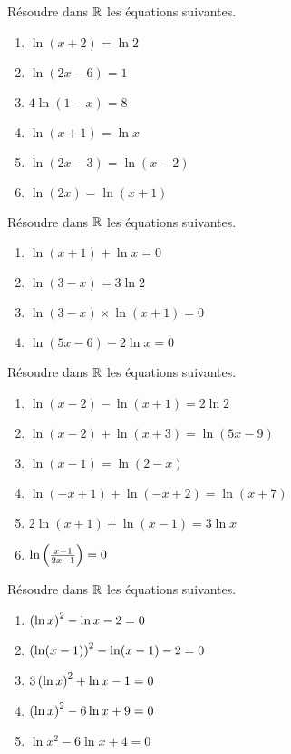   \begin{exercice}
Résoudre dans $ \mathbb{R} $  les équations suivantes.
   
\begin{enumerate}
\item $ \ln (x +2)=\ln2 $  
\item $ \ln (2x- 6)=1$  
\item  $ 4\ln(1-x)=8 $  
\item $ \ln(x+1)=\ln x$  
\item $ \ln(2x-3)=\ln (x-2)$ 
\item $ \ln(2x)=\ln (x+1)$ 
\end{enumerate}


  \end{exercice}
  
   \begin{exercice}
Résoudre dans $ \mathbb{R} $  les équations suivantes.

\begin{enumerate}
\item $ \ln (x +1)+\ln x=0 $  
\item $ \ln (3- x )=3\ln 2$  
\item  $ \ln(3-x)\times \ln(x+1)=0  $  
\item $ \ln(5x-6)-2\ln x=0$  
\end{enumerate}


  \end{exercice}
  
  

\begin{exercice}
Résoudre dans $ \mathbb{R} $  les équations suivantes.
\begin{enumerate}
\item $ \ln (x -2)-\ln (x+1)=2\ln 2 $  
\item $ \ln ( x-2 )+\ln (x+3)=\ln (5x-9)$  
\item  $ \ln(x-1)=\ln(2-x)  $ 
 \item $ \ln(-x+1)+\ln (-x+2)=\ln (x+7)$ 
\item $ 2\ln(x+1)+\ln (x-1)=3\ln x$ 
\item  $ \ln \left(\frac{x-1}{2x-1}\right) =0$ 
\end{enumerate}
  \end{exercice}
  
  \begin{exercice}
Résoudre dans $ \mathbb{R} $   les équations suivantes.
\begin{enumerate} 
\item $\left(\ln x\right)^{2} -\ln x-2=0  $ 
\item  $\left(\ln (x-1)\right)^{2} -\ln (x-1)-2=0  $ 
\item $3\left(\ln x\right)^{2} +\ln x-1=0  $                                                   
\item $\left(\ln x\right)^{2} -6\ln x+9=0  $
\item $\ln x^{2} -6\ln x+4=0  $  
\end{enumerate}

  \end{exercice}
  
